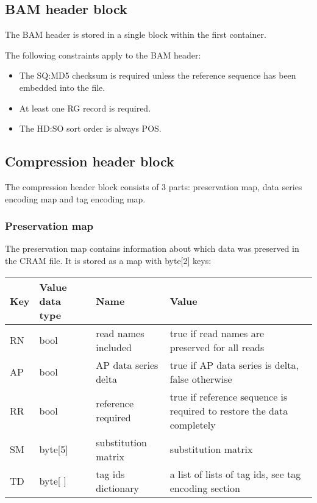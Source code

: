\documentclass[a4paper]{article}
\begin{document}
\subsection{\textbf{BAM header block}}

The BAM header is stored in a single block within the first container. 

The following constraints apply to the BAM header: 

\begin{itemize}
\item The SQ:MD5 checksum is required unless the reference sequence has been embedded 
into the file.

\item At least one RG record is required.

\item The HD:SO sort order is always POS.
\end{itemize}

\subsection{\textbf{Compression header block}}

The compression header block consists of 3 parts: preservation map, data series 
encoding map and tag encoding map.

\subsubsection*{Preservation map}

The preservation map contains information about which data was preserved in the 
CRAM file. It is stored as a map with byte[2] keys:

\begin{tabular}{|l|l|>{\raggedright}p{100pt}|>{\raggedright}p{220pt}|}
\hline
\textbf{Key} & \textbf{Value data type} & \textbf{Name} & \textbf{Value}\tabularnewline
\hline
RN & bool & read names included & true if read names are preserved for all reads\tabularnewline
\hline
AP & bool & AP data series delta & true if AP data series is delta, false otherwise\tabularnewline
\hline
RR & bool & reference required & true if reference sequence is required to restore 
the data completely\tabularnewline
\hline
SM & byte[5] & substitution matrix & substitution matrix\tabularnewline
\hline
TD & byte[ ] & tag ids dictionary & a list of lists of tag ids, see tag encoding 
section\tabularnewline
\hline
\end{tabular}
\end{document}
